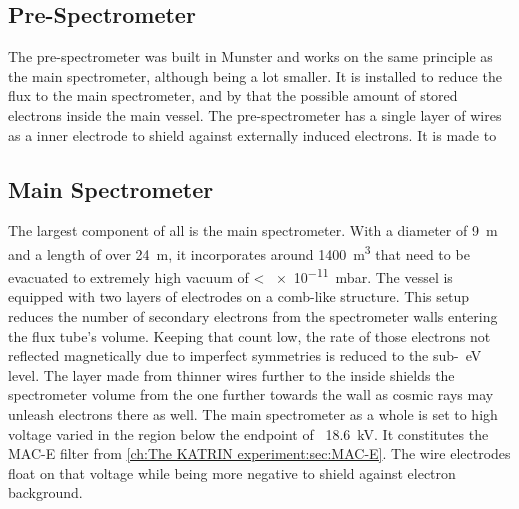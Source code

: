       \subsection{Pre-Spectrometer}
      \label{ch:The KATRIN experiment:sec:Experimental setup:subsec:PreSpectrometer}
      The pre-spectrometer was built in Munster and works on the same principle as the main spectrometer, although being a lot smaller. It is installed to reduce the flux to the main spectrometer, and by that the possible amount of stored electrons inside the main vessel. The pre-spectrometer has a single layer of wires as a inner electrode to shield against externally induced electrons. It is made to 
      \subsection{Main Spectrometer}
      \label{ch:The KATRIN experiment:sec:Experimental setup:subsec:MainSpec}
      The largest component of all is the main spectrometer. With a diameter of \SI{9}{\meter} and a length of over \SI{24}{\meter}, it incorporates around \SI{1400}{\cubic\meter} that need to be evacuated to extremely high vacuum of < \SI{e-11}{\milli\bar}. The vessel is equipped with two layers of electrodes on a comb-like structure. This setup reduces the number of secondary electrons from the spectrometer walls entering the flux tube's volume. Keeping that count low, the rate of those electrons not reflected magnetically due to imperfect symmetries is reduced to the sub-\SI{}{\electronvolt} level. The layer made from thinner wires further to the inside shields the spectrometer volume from the one further towards the wall as cosmic rays may unleash electrons there as well.
      The main spectrometer as a whole is set to high voltage varied in the region below the endpoint of ~\SI{18.6}{\kilo\volt}. It constitutes the MAC-E filter from \ref{ch:The KATRIN experiment:sec:MAC-E}. The wire electrodes float on that voltage while being more negative to shield against electron background.
